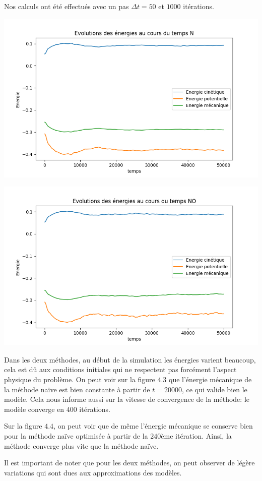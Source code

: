 Nos calculs ont été effectués avec un pas $\Delta t = 50 $ et $1000$ itérations.

\begin{center}
\includegraphics[scale=0.6]{resultats/Energy_N.png}
\captionsetup{hypcap=false}
\label{fig4}
\end{center} 

\begin{center}
\includegraphics[scale=0.6]{resultats/Energy_NO.png}
\captionsetup{hypcap=false}
\label{fig5}
\end{center} 


Dans les deux méthodes, au début de la simulation les énergies
varient beaucoup, cela est dû aux conditions initiales qui ne
respectent pas forcément l'aspect physique du problème.
On peut voir sur la figure $4.3$ que l'énergie mécanique de la
méthode naïve est bien constante à partir de $t=20000$, ce qui
valide bien le modèle. Cela nous informe aussi sur la vitesse de
convergence de la méthode: le modèle converge en $400$ itérations.

Sur la figure $4.4$, on peut voir que de même l'énergie mécanique
se conserve bien pour la méthode naïve optimisée à partir de la
$240$ème itération. Ainsi, la méthode converge plus vite que la 
méthode naïve.

Il est important de noter que pour les deux méthodes, on peut
observer de légère variations qui sont dues aux approximations des
modèles.